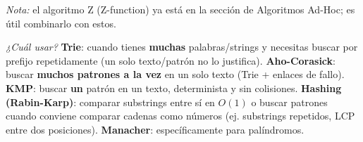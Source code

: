 \textit{Nota:} el algoritmo Z (Z-function) ya está en la sección de Algoritmos Ad-Hoc; es útil combinarlo con estos.

\textit{¿Cuál usar?} \textbf{Trie}: cuando tienes \textbf{muchas} palabras/strings y necesitas buscar por prefijo repetidamente (un solo texto/patrón no lo justifica). \textbf{Aho-Corasick}: buscar \textbf{muchos patrones a la vez} en un solo texto (Trie + enlaces de fallo). \textbf{KMP}: buscar \textbf{un} patrón en un texto, determinista y sin colisiones. \textbf{Hashing (Rabin-Karp)}: comparar substrings entre sí en \(O(1)\) o buscar patrones cuando conviene comparar cadenas como números (ej. substrings repetidos, LCP entre dos posiciones). \textbf{Manacher}: específicamente para palíndromos.
